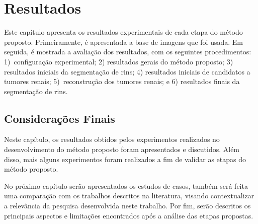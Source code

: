\chapter{Resultados}
\label{cap:resultados}



Este capítulo apresenta os resultados experimentais de cada etapa do método proposto. Primeiramente, é apresentada a base de imagens que foi usada. Em seguida, é mostrada a avaliação dos resultados, com os seguintes procedimentos: 1)~configuração experimental; 2) resultados gerais do método proposto; 3) resultados iniciais da segmentação de rins; 4) resultados iniciais de candidatos a tumores renais; 5)~reconstrução dos tumores renais; e 6) resultados finais da segmentação de rins. 


\section{Considerações Finais}
\label{consideracoes-finais-resultados}

Neste capítulo, os resultados obtidos pelos experimentos realizados no desenvolvimento do método proposto foram apresentados e discutidos. Além disso, mais alguns experimentos foram realizados a fim de validar as etapas do método proposto.

No próximo capítulo serão apresentados os estudos de casos, também será feita uma comparação com os trabalhos descritos na literatura, visando contextualizar a relevância da pesquisa desenvolvida neste trabalho. Por fim, serão descritos os principais aspectos e limitações encontrados após a análise das etapas propostas.